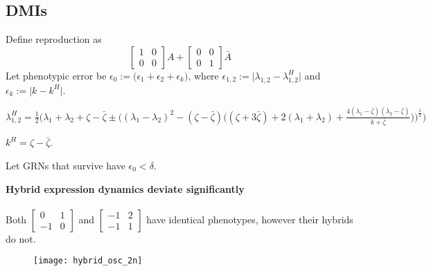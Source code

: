 \documentclass{seminar}
\begin{document}
  \begin{slide}
    \section*{DMIs}
      Define reproduction as 
      \begin{equation*}
        \begin{bmatrix} 1 & 0 \\ 0 & 0 \end{bmatrix} A + \begin{bmatrix} 0 & 0 \\ 0 & 1 \end{bmatrix} \bar{A}
      \end{equation*}
      Let phenotypic error be $\epsilon_0 := \big( \epsilon_{1} + \epsilon_{2} + \epsilon_{k} \big)$, where $\epsilon_{1,2} := \vert \lambda_{1,2} - \lambda^{H}_{1,2} \vert$ and $\epsilon_{k} := \vert k - k^{H} \vert$.
      
      $\lambda^{H}_{1,2} = \frac{1}{2} \Bigg( \lambda_{1} + \lambda_{2} + \zeta - \bar{\zeta} \pm \Big( (\lambda_{1} - \lambda_{2})^{2} - (\zeta - \bar{\zeta}) \big( ( \zeta + 3\bar{\zeta}) + 2 (\lambda_{1} + \lambda_{2}) + \frac{4(\lambda_{1} - \bar{\zeta})(\lambda_{2} - \bar{\zeta})}{k+\bar{\zeta}}\big) \Big)^{\frac{1}{2}} \Bigg)$

      $k^{H} = \zeta - \bar{\zeta}$. 

      Let GRNs that survive have $\epsilon_{0} < \delta$.
  \end{slide}

  \begin{slide}
    \textbf{Hybrid expression dynamics deviate significantly}
   \\\\ 
    Both $\begin{bmatrix} 0 & 1 \\ -1 & 0 \end{bmatrix}$ and $\begin{bmatrix} -1 & 2 \\ -1 & 1 \end{bmatrix}$ have identical phenotypes, however their hybrids do not. 
      \begin{figure}
        \hspace*{-3.7cm}
        \texttt{[image: hybrid\_osc\_2n]}
      \end{figure}
  \end{slide}
\end{document}

